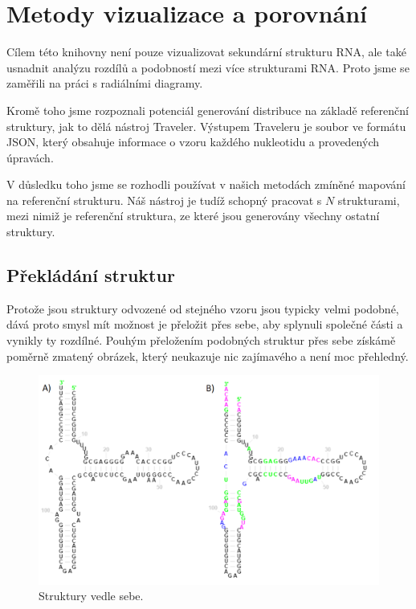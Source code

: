 
\chapter{Metody vizualizace a porovnání}

Cílem této knihovny není pouze vizualizovat sekundární strukturu RNA, ale také
usnadnit analýzu rozdílů a podobností mezi více strukturami RNA. Proto jsme se
zaměřili na práci s radiálními diagramy.

Kromě toho jsme rozpoznali potenciál generování distribuce na základě
referenční struktury, jak to dělá nástroj Traveler. Výstupem Traveleru je
soubor ve formátu JSON, který obsahuje informace o vzoru každého nukleotidu a
provedených úpravách.

V důsledku toho jsme se rozhodli používat v našich metodách zmíněné mapování na
referenční strukturu. Náš nástroj je tudíž schopný pracovat s $N$ strukturami,
mezi nimiž je referenční struktura, ze které jsou generovány všechny ostatní
struktury.

\section{Překládání struktur}

Protože jsou struktury odvozené od stejného vzoru jsou typicky velmi podobné,
dává proto smysl mít možnost je přeložit přes sebe, aby splynuli společné části
a vynikly ty rozdílné. Pouhým přeložením podobných struktur přes sebe získámě
poměrně zmatený obrázek, který neukazuje nic zajímavého a není moc přehledný.

\begin{figure}[H]
  \centering
  \includegraphics[width=140mm]{../img/kap02/align/structures.png}
  \caption{Struktury vedle sebe.}
\end{figure}


